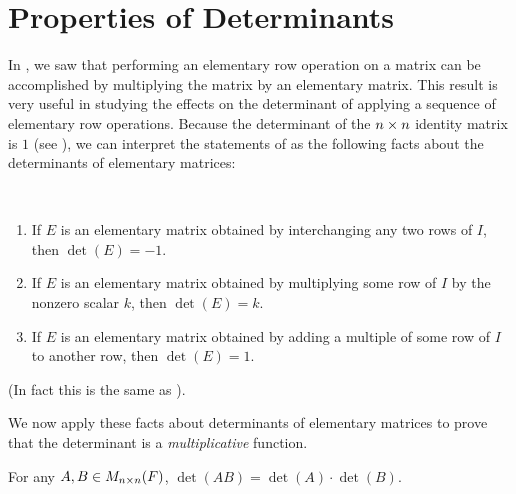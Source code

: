 \section{Properties of Determinants} \label{sec 4.3}

In , we saw that performing an elementary row operation on a matrix can be accomplished by multiplying the matrix by an elementary matrix.
This result is very useful in studying the effects on the determinant of applying a sequence of elementary row operations.
Because the determinant of the \(n \times n\) identity matrix is \(1\) (see ), we can interpret the statements of  as the following facts about the determinants of elementary matrices:

\begin{remark} \label{remark 4.3.1} \ 

\begin{enumerate}
\item If \(E\) is an elementary matrix obtained by interchanging any two rows of \(I\), then \(\det(E) = -1\).
\item If \(E\) is an elementary matrix obtained by multiplying some row of \(I\) by the nonzero scalar \(k\), then \(\det(E) = k\).
\item If \(E\) is an elementary matrix obtained by adding a multiple of some row of \(I\) to another row, then \(\det(E) = 1\).
\end{enumerate}
(In fact this is the same as ).
\end{remark}

We now apply these facts about determinants of elementary matrices to prove that the determinant is a \emph{multiplicative} function.

\begin{theorem} \label{thm 4.7}
For any \(A, B \in M_{n \times n}(F)\), \(\det(AB) = \det(A) \cdot \det(B)\).
\end{theorem}

